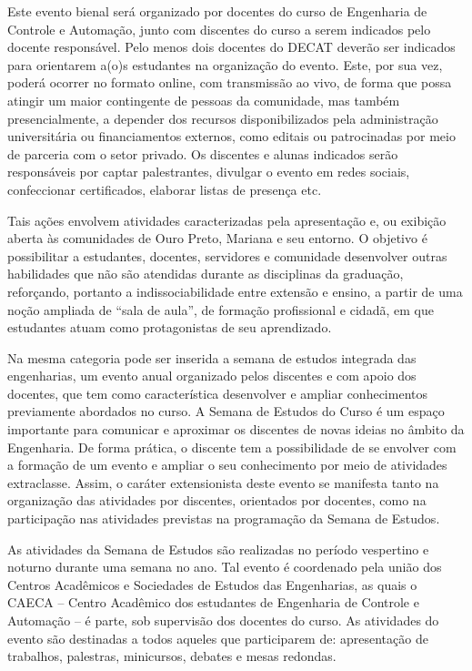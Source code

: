 \documentclass[
	12pt,				%
	openright,			%
	oneside,			%
	a4paper,			%
	english,			%
	brazil				%
	]{abntex2}
\begin{document}
Este evento bienal será organizado por docentes do curso de Engenharia de Controle e Automação, junto com discentes do curso a serem indicados pelo docente responsável. Pelo menos dois docentes do DECAT deverão ser indicados para orientarem a(o)s estudantes na organização do evento. Este, por sua vez, poderá ocorrer no formato online, com transmissão ao vivo, de forma que possa atingir um  maior contingente de pessoas da comunidade, mas também presencialmente, a depender dos recursos disponibilizados pela administração universitária ou financiamentos externos, como editais ou patrocinadas por meio de parceria com o setor privado. Os discentes e alunas indicados serão responsáveis por captar palestrantes, divulgar o evento em redes sociais, confeccionar certificados, elaborar listas de presença etc.

Tais ações envolvem atividades caracterizadas pela apresentação e, ou exibição aberta às comunidades de Ouro Preto, Mariana e seu entorno. O objetivo é possibilitar a estudantes, docentes, servidores e comunidade desenvolver outras habilidades que não são atendidas durante as disciplinas da graduação, reforçando, portanto a indissociabilidade entre extensão e ensino, a partir de uma noção ampliada de ``sala de aula'', de formação profissional e cidadã, em que estudantes atuam como protagonistas de seu aprendizado.

Na mesma categoria pode ser inserida a semana de estudos integrada das engenharias, um evento anual organizado pelos discentes e com apoio dos docentes, que tem como característica desenvolver e ampliar conhecimentos previamente abordados no curso. A Semana de Estudos do Curso é um espaço importante para comunicar e aproximar os discentes de novas ideias no âmbito da Engenharia. De forma prática, o discente tem a possibilidade de se envolver com a formação de um evento e ampliar o seu conhecimento por meio de atividades extraclasse. Assim, o caráter extensionista deste evento se manifesta tanto na organização das atividades por discentes, orientados por docentes, como na participação nas atividades previstas na programação da Semana de Estudos.

As atividades da Semana de Estudos são realizadas no período vespertino e noturno durante uma semana no ano. Tal evento é coordenado pela união dos Centros Acadêmicos e Sociedades de Estudos das Engenharias, as quais o CAECA -- Centro Acadêmico dos estudantes de Engenharia de Controle e Automação -- é parte, sob supervisão dos docentes do curso. As atividades do evento são destinadas a todos aqueles que participarem de: apresentação de trabalhos, palestras, minicursos, debates e mesas redondas.
\end{document}
